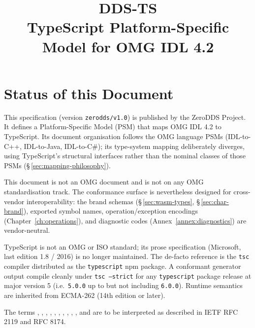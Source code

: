 \documentclass{../styles/zerodds-vendor-spec}
\title{DDS-TS\\\large TypeScript Platform-Specific Model for OMG IDL 4.2}
\begin{document}
\maketitle

\tableofcontents
\clearpage

\chapter*{Status of this Document}

This specification (version \texttt{zerodds/v1.0}) is
published by the ZeroDDS Project. It defines a Platform-Specific
Model (PSM) that maps OMG IDL 4.2 to TypeScript. Its document
organisation follows the OMG language PSMs (IDL-to-C++,
IDL-to-Java, IDL-to-C\#); its type-system mapping deliberately
diverges, using TypeScript's structural interfaces rather than
the nominal classes of those PSMs
(\S\,\ref{sec:mapping-philosophy}).

This document is not an OMG document and is not on any OMG
standardisation track. The conformance surface is nevertheless
designed for cross-vendor interoperability: the brand schemas
(\S\,\ref{sec:wasm-types}, \S\,\ref{sec:char-brand}), exported
symbol names, operation/exception encodings
(Chapter~\ref{ch:operations}), and diagnostic codes
(Annex~\ref{annex:diagnostics}) are vendor-neutral.

TypeScript is not an OMG or ISO standard; its prose
specification (Microsoft, last edition 1.8 / 2016) is no longer
maintained. The de-facto reference is the \texttt{tsc} compiler
distributed as the \texttt{typescript} npm package. A conformant
generator output  compile cleanly under
\texttt{tsc --strict} for any \texttt{typescript} package
release at major version 5 (i.e.\ \texttt{5.0.0} up to but not
including \texttt{6.0.0}). Runtime semantics are inherited from ECMA-262
(14th edition or later).

The terms , , ,
, , , ,
, , , and
 are to be interpreted as described in IETF RFC
2119 and RFC 8174.

\end{document}
